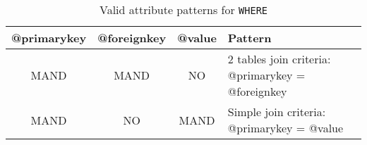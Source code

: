\begin{table}[!htbp]
\small
\centering
\begin{tabulary}{\linewidth}{|c|c|c|J|}
    \hline 
        \textbf{@primarykey} &
        \textbf{@foreignkey} &
        \textbf{@value} &
        \textbf{Pattern}\\
    \hline      \hline  
        MAND &           
        MAND &           
        NO &           
        2 tables join criteria: @primarykey = @foreignkey \\
    \hline     
        MAND &           
        NO &           
        MAND &           
        Simple join criteria: @primarykey = @value \\
   \hline 
\end{tabulary}
     \caption{Valid attribute patterns for  \texttt{WHERE}}
     \label{tbl:where-pattern}
\end{table}
